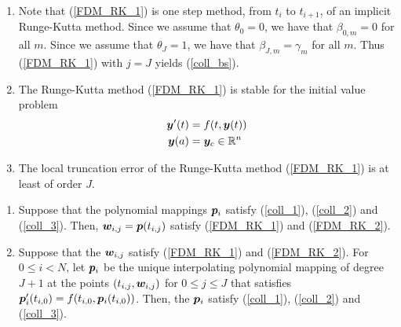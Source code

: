 \begin{rmkList}
\begin{enumerate}
\item Note that (\ref{FDM_RK_1}) is one step method, from $t_i$ to
$t_{i+1}$, of an implicit Runge-Kutta method.  Since we assume that
$\theta_0=0$, we have that $\beta_{0,m}=0$ for all $m$.
Since we assume that $\theta_J=1$, we have that
$\beta_{J,m} = \gamma_m$ for all $m$.  Thus (\ref{FDM_RK_1}) with
$j=J$ yields (\ref{coll_bs}).
\item The Runge-Kutta method (\ref{FDM_RK_1}) is stable for the
initial value problem
\begin{align*}
\bm{y}'(t) &= f(t,\bm{y}(t)) \\
\bm{y}(a) &= \bm{y}_c \in \mathbb{R}^n
\end{align*}
\item The local truncation error of the Runge-Kutta method
(\ref{FDM_RK_1}) is at least of order $J$.
\end{enumerate}
\end{rmkList}

\begin{theorem}
\begin{enumerate}
\item Suppose that the polynomial mappings $\bm{p}_i$ satisfy
(\ref{coll_1}), (\ref{coll_2}) and (\ref{coll_3}).  Then,
$\bm{w}_{i,j} = \bm{p}(t_{i,j})$ satisfy (\ref{FDM_RK_1})
and (\ref{FDM_RK_2}).
\item Suppose that the $\bm{w}_{i,j}$ satisfy (\ref{FDM_RK_1}) and
(\ref{FDM_RK_2}).  For $0\leq i < N$, let $\bm{p}_i$ be
the unique interpolating polynomial mapping of degree $J+1$ at the
points $(t_{i,j},\bm{w}_{i,j})$ for $0\leq j \leq J$ that satisfies
$\bm{p}_i'(t_{i,0}) = f(t_{i,0},\bm{p}_i(t_{i,0}))$.  Then,
the $\bm{p}_i$ satisfy (\ref{coll_1}), (\ref{coll_2}) and
(\ref{coll_3}).
\end{enumerate}
\end{theorem}

